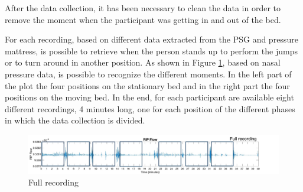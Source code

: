 After the data collection, it has been necessary to clean the data in order to remove the moment when the participant was getting in and out of the bed.\newline

 For each recording, based on different data extracted from the PSG and pressure mattress, is possible to retrieve when the person stands up to perform the jumps or to turn around in another position. As shown in Figure \ref{fig:recordingCutfull}, based on nasal pressure data, is possible to recognize the different moments. In the left part of the plot the four positions on the stationary bed and in the right part the four positions on the moving bed.
 In the end, for each participant are available eight different recordings, 4 minutes long, one for each position of the different phases in which the data collection is divided.


\begin{figure}[H]
    \centering
    \includegraphics[width=1.1\textwidth]{img/full.pdf}
    \caption{Full recording}
    \label{fig:recordingCutfull}
\end{figure}